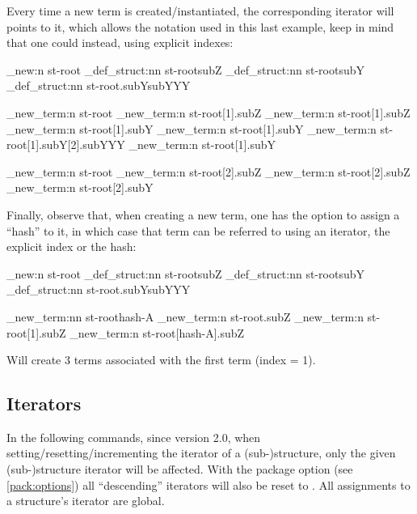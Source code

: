 \documentclass[10pt]{article}
\begin{document}
Every time a new term is created/instantiated, the corresponding iterator will points to it, which allows the notation used in this last example, keep in mind that one could instead, using explicit indexes:

\begin{codestore}[store-env=demo5]
\starray_new:n {st-root}
\starray_def_struct:nn {st-root}{subZ}
\starray_def_struct:nn {st-root}{subY}
\starray_def_struct:nn {st-root.subY}{subYYY}

\starray_new_term:n {st-root}
\starray_new_term:n {st-root[1].subZ}
\starray_new_term:n {st-root[1].subZ}
\starray_new_term:n {st-root[1].subY}
\starray_new_term:n {st-root[1].subY}
\starray_new_term:n {st-root[1].subY[2].subYYY}
\starray_new_term:n {st-root[1].subY}

\starray_new_term:n {st-root}
\starray_new_term:n {st-root[2].subZ}
\starray_new_term:n {st-root[2].subZ}
\starray_new_term:n {st-root[2].subY}
\end{codestore}


Finally, observe that, when creating a new term, one has the option to assign a ``hash'' to it, in which case that term can be referred to using an iterator, the explicit index or the hash:

\begin{codestore}[store-env=demo6]
\starray_new:n {st-root}
\starray_def_struct:nn {st-root}{subZ}
\starray_def_struct:nn {st-root}{subY}
\starray_def_struct:nn {st-root.subY}{subYYY}

\starray_new_term:nn {st-root}{hash-A}
\starray_new_term:n {st-root.subZ}
\starray_new_term:n {st-root[1].subZ}
\starray_new_term:n {st-root[hash-A].subZ}
\end{codestore}
 
Will create 3  terms associated with the first   term (index = 1).


\subsection{Iterators}\label{pack:iter}
In the following commands, since version 2.0, when setting/resetting/incrementing the  iterator of a (sub-)structure, only the given (sub-)structure iterator will be affected. With the package option  (see \ref{pack:options}) all ``descending'' iterators will also be reset to .  All assignments to a structure's iterator are global.
\end{document}
